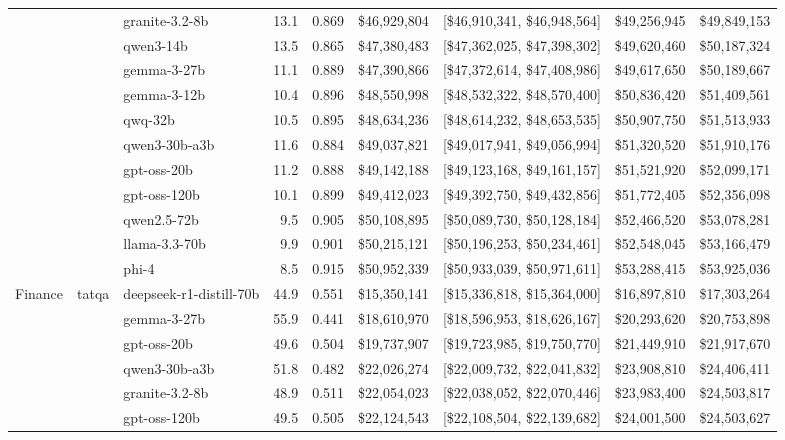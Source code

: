 \begin{table}[t]
\begin{tabular}{lllrrrrrr}
   &  & granite-3.2-8b & 13.1 & 0.869 & \$46,929,804 & [\$46,910,341, \$46,948,564] & \$49,256,945 & \$49,849,153 \\
   &  & qwen3-14b & 13.5 & 0.865 & \$47,380,483 & [\$47,362,025, \$47,398,302] & \$49,620,460 & \$50,187,324 \\
   &  & gemma-3-27b & 11.1 & 0.889 & \$47,390,866 & [\$47,372,614, \$47,408,986] & \$49,617,650 & \$50,189,667 \\
   &  & gemma-3-12b & 10.4 & 0.896 & \$48,550,998 & [\$48,532,322, \$48,570,400] & \$50,836,420 & \$51,409,561 \\
   &  & qwq-32b & 10.5 & 0.895 & \$48,634,236 & [\$48,614,232, \$48,653,535] & \$50,907,750 & \$51,513,933 \\
   &  & qwen3-30b-a3b & 11.6 & 0.884 & \$49,037,821 & [\$49,017,941, \$49,056,994] & \$51,320,520 & \$51,910,176 \\
   &  & gpt-oss-20b & 11.2 & 0.888 & \$49,142,188 & [\$49,123,168, \$49,161,157] & \$51,521,920 & \$52,099,171 \\
   &  & gpt-oss-120b & 10.1 & 0.899 & \$49,412,023 & [\$49,392,750, \$49,432,856] & \$51,772,405 & \$52,356,098 \\
   &  & qwen2.5-72b & 9.5 & 0.905 & \$50,108,895 & [\$50,089,730, \$50,128,184] & \$52,466,520 & \$53,078,281 \\
   &  & llama-3.3-70b & 9.9 & 0.901 & \$50,215,121 & [\$50,196,253, \$50,234,461] & \$52,548,045 & \$53,166,479 \\
   &  & phi-4 & 8.5 & 0.915 & \$50,952,339 & [\$50,933,039, \$50,971,611] & \$53,288,415 & \$53,925,036 \\
\midrule
  Finance & tatqa & deepseek-r1-distill-70b & 44.9 & 0.551 & \$15,350,141 & [\$15,336,818, \$15,364,000] & \$16,897,810 & \$17,303,264 \\
   &  & gemma-3-27b & 55.9 & 0.441 & \$18,610,970 & [\$18,596,953, \$18,626,167] & \$20,293,620 & \$20,753,898 \\
   &  & gpt-oss-20b & 49.6 & 0.504 & \$19,737,907 & [\$19,723,985, \$19,750,770] & \$21,449,910 & \$21,917,670 \\
   &  & qwen3-30b-a3b & 51.8 & 0.482 & \$22,026,274 & [\$22,009,732, \$22,041,832] & \$23,908,810 & \$24,406,411 \\
   &  & granite-3.2-8b & 48.9 & 0.511 & \$22,054,023 & [\$22,038,052, \$22,070,446] & \$23,983,400 & \$24,503,817 \\
   &  & gpt-oss-120b & 49.5 & 0.505 & \$22,124,543 & [\$22,108,504, \$22,139,682] & \$24,001,500 & \$24,503,627 \\

\end{tabular}
\end{table}
